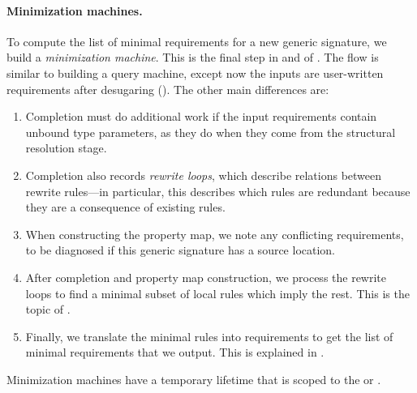 \documentclass[../generics]{subfiles}
\begin{document}
\paragraph{Minimization machines.}
To compute the list of minimal requirements for a new generic signature, we build a \emph{minimization machine}. This is the final step in  and  of . The flow is similar to building a query machine, except now the inputs are user-written requirements after desugaring (). The other main differences are:
\begin{enumerate}
\item Completion must do additional work if the input requirements contain unbound type parameters, as they do when they come from the structural resolution stage.
\item Completion also records \emph{rewrite loops}, which describe relations between rewrite rules---in particular, this describes which rules are redundant because they are a consequence of existing rules.
\item When constructing the property map, we note any conflicting requirements, to be diagnosed if this generic signature has a source location.
\item After completion and property map construction, we process the rewrite loops to find a minimal subset of local rules which imply the rest. This is the topic of .
\item Finally, we translate the minimal rules into requirements to get the list of minimal requirements that we output. This is explained in .
\end{enumerate}
Minimization machines have a temporary lifetime that is scoped to the  or .
\end{document}

